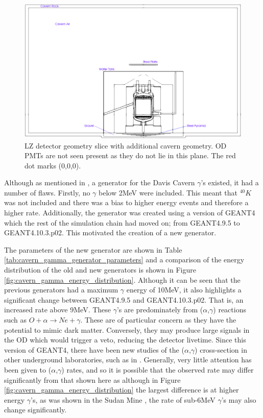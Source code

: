 \begin{figure}[!htbp]
\includegraphics[width=\textwidth]{Figures/Geometry/cavern_geometry_with_markings.png}
\centering
\caption{LZ detector geometry slice with additional cavern geometry. OD PMTs are not seen present as they do not lie in this plane. The red dot marks (0,0,0).}
\label{fig:Cavern_Geometry}
\end{figure}

\par
Although as mentioned in \cite{lz_simulations_ref}, a generator for the Davis Cavern $\gamma$'s existed, it had a number of flaws.
Firstly, no $\gamma$ below 2MeV were included.
This meant that $^{40}K$ was not included and there was a bias to higher energy events and therefore a higher rate.
Additionally, the generator was created using a version of GEANT4 which the rest of the simulation chain had moved on; from GEANT4.9.5 to GEANT4.10.3.p02. 
This motivated the creation of a new generator.

\par
The parameters of the new generator are shown in Table \ref{tab:cavern_gamma_generator_parameters} and a comparison of the energy distribution of the old and new generators is shown in Figure \ref{fig:cavern_gamma_energy_distribution}.
Although it can be seen that the previous generators had a maximum $\gamma$ energy of 10MeV, it also highlights a significant change between GEANT4.9.5 and GEANT4.10.3.p02.
That is, an increased rate above 9MeV.
These $\gamma$'s are predominately from ($\alpha$,$\gamma$) reactions such as $O + \alpha \to Ne + \gamma$.
These are of particular concern as they have the potential to mimic dark matter.
Conversely, they may produce large signals in the OD which would trigger a veto, reducing the detector livetime.
Since this version of GEANT4, there have been new studies of the ($\alpha$,$\gamma$) cross-section in other underground laboratories, such as in \cite{cavern_gammas_in_Soudan_mine_ref}.
Generally, very little attention has been given to ($\alpha$,$\gamma$) rates, and so it is possible that the observed rate may differ significantly from that shown here as although in Figure \ref{fig:cavern_gamma_energy_distribution} the largest difference is at higher energy $\gamma$'s, as was shown in the Sudan Mine \cite{cavern_gammas_in_Soudan_mine_ref}, the rate of sub-6MeV $\gamma$'s may also change significantly. 


